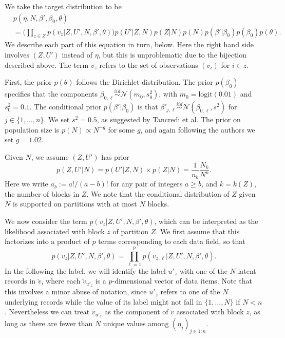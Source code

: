 \documentclass[ba]{imsart}
\newcommand{\iidsim}{\stackrel{iid}{\sim}}
\begin{document}
We take the target distribution to be
\begin{align}
    & p(\eta, N, \beta', \beta_0, \theta)\nonumber \\
    & = \Big( \prod_{z\in Z} p(v_z|Z,U',N,\beta',\theta) \Big) p(U'|Z,N)p(Z|N)p(N)p(\beta'|\beta_0) p(\beta_0) p(\theta). \label{eq:posteriorfactorization}
\end{align}
We describe each part of this equation in turn, below.
Here the right hand side involves $(Z,U')$ instead of $\eta$, but this is unproblematic due to the bijection described above. 
The term $v_z$ refers to the set of observations $(v_i)$ for $i\in z$. 

First, the prior $p(\theta)$ follows the Dirichlet distribution.
The prior $p(\beta_0)$ specifies that the components $\beta_{0,\ell} \iidsim \mathcal{N}(m_0, s_0^2)$, with $m_0=\text{logit}(0.01)$ and $s_0^2 = 0.1$. The conditional prior $p(\beta' | \beta_0)$ is that 
$\beta'_{j,\ell} \iidsim \mathcal{N}(\beta_{0,\ell},s^2)$
for $j\in\{1,\ldots,n\}$. We set $s^2 = 0.5$, as suggested by 
Tancredi et al.
The prior on population size is $p(N)\propto N^{-g}$ for some $g$, and again following the authors we set $g=1.02$.

Given $N$, we assume $(Z,U')$ has prior
\begin{equation}
\label{eq:priorZU}
    p(Z,U'|N) = p(U'|Z,N)\times p(Z|N) = \frac{1}{n_k} \frac{N_k}{N^n}.
\end{equation}
Here we write $a_b := a!/(a-b)!$ for any pair of integers $a\geq b$, and $k = k(Z)$, the number of blocks in $Z$. We note that the conditional distribution of $Z$ given $N$ is supported on partitions with at most $N$ blocks.

We now consider the term $p(v_z|Z,U',N,\beta',\theta)$, which can be interpreted as the likelihood associated with block $z$ of partition $Z$.  We first assume that this factorizes into a product of $p$ terms corresponding to each data field, so that
\begin{equation}
p(v_z|Z,U',N,\beta',\theta) = \prod_{\ell=1}^p p(v_{z,\ell}|Z,U',N,\beta',\theta).
\label{eq:productoverfields}
\end{equation}
In the following the label, we will identify the label $u'_z$ with one of the $N$ latent records in $\tilde{v}$, where each $\tilde{v}_{u'_z}$ is a $p$-dimensional vector of data items.
Note that this involves a minor abuse of notation, since $u'_z$ refers to one of the $N$ underlying records while the value of its label might not fall in $\{1,\ldots,N\}$ if $N < n$. Nevertheless we can 
treat $\tilde{v}_{u'_z}$ as the component of $\tilde{v}$ associated with block $z$, as long as there are fewer than $N$ 
unique values among $(\eta_j)_{j\in 1:n}$.
\end{document}
